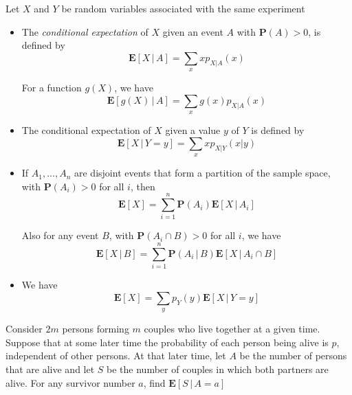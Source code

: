 \documentclass{tufte-handout}
\theoremstyle{definition} \newtheorem{definition}{Definition}
\theoremstyle{definition} \newtheorem{remark}{Remark}
\newcommand{\prob}[1]{\mathbf{P} \left( #1 \right)}
\newcommand{\cprob}[2]{\mathbf{P} \left( #1 \, | \, #2 \right)}
\newcommand{\pmf}[2]{p_{#1} \left( #2 \right)}
\newcommand{\expt}[1]{\mathbf{E} \left[ #1 \right]}
\newcommand{\cpmf}[3]{p_{#1 | #2} \left( #3 \right)}
\newcommand{\cexpt}[2]{\mathbf{E} \left[ #1 \, | \, #2 \right]}
\begin{document}
Let $X$ and $Y$ be random variables associated with the same experiment
\begin{itemize}
\item The \emph{conditional expectation} of $X$ given an event $A$ with
  $\prob{A} > 0$, is defined by
  \begin{equation*}
    \cexpt{X}{A} = \sum_x x \cpmf{X}{A}{x}
  \end{equation*}

  For a function $g(X)$, we have
    \begin{equation*}
    \cexpt{g(X)}{A} = \sum_x g(x) \cpmf{X}{A}{x}
  \end{equation*}

\item The conditional expectation of $X$ given a value $y$ of $Y$ is
  defined by
  \begin{equation*}
    \cexpt{X}{Y = y} = \sum_x x \cpmf{X}{Y}{x | y}
  \end{equation*}

\item   If $A_1, \ldots, A_n$ are disjoint events that form a partition
  of the sample space, with $\prob{A_i} > 0$ for all $i$, then
  \begin{equation*}
    \expt{X} = \sum_{i = 1} ^n \prob{A_i} \cexpt{X}{A_i}
  \end{equation*}

  Also for any event $B$, with $\prob{A_i \cap B} > 0$ for all $i$, we
  have
  \begin{equation*}
    \cexpt{X}{B} = \sum_{i = 1} ^n \cprob{A_i}{B} \cexpt{X}{A_i \cap B}
  \end{equation*}

\item We have
  \begin{equation*}
    \expt{X} = \sum_y \pmf{Y}{y} \cexpt{X}{Y = y}
  \end{equation*}
\end{itemize}

\begin{example}
  Consider $2m$ persons forming $m$ couples who live together at a given
  time. Suppose that at some later time the probability of each person
  being alive is $p$, independent of other persons. At that later time,
  let $A$ be the number of persons that are alive and let $S$ be the
  number of couples in which both partners are alive. For any survivor
  number $a$, find $\cexpt{S}{A = a}$
\end{example}
\end{document}
